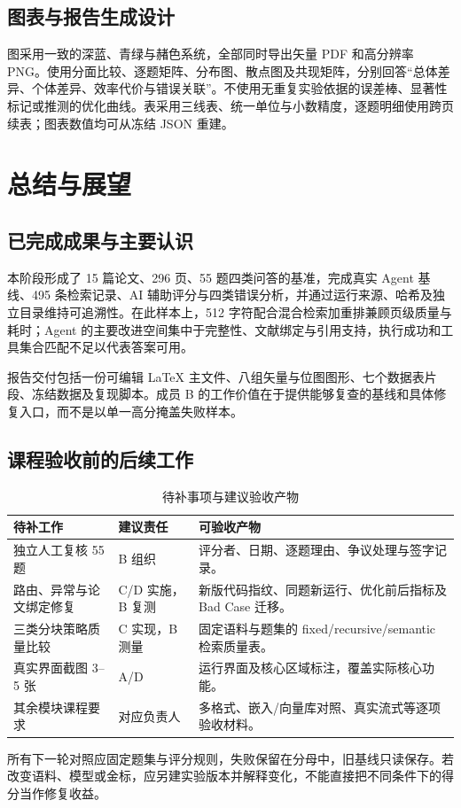 \documentclass[UTF8,a4paper,zihao=-4,fontset=none]{ctexart}
\begin{document}
\subsection{图表与报告生成设计}
图采用一致的深蓝、青绿与赭色系统，全部同时导出矢量 PDF 和高分辨率 PNG。使用分面比较、逐题矩阵、分布图、散点图及共现矩阵，分别回答“总体差异、个体差异、效率代价与错误关联”。不使用无重复实验依据的误差棒、显著性标记或推测的优化曲线。表采用三线表、统一单位与小数精度，逐题明细使用跨页续表；图表数值均可从冻结 JSON 重建。

\section{总结与展望}
\subsection{已完成成果与主要认识}
本阶段形成了 15 篇论文、296 页、55 题四类问答的基准，完成真实 Agent 基线、495 条检索记录、AI 辅助评分与四类错误分析，并通过运行来源、哈希及独立目录维持可追溯性。在此样本上，512 字符配合混合检索加重排兼顾页级质量与耗时；Agent 的主要改进空间集中于完整性、文献绑定与引用支持，执行成功和工具集合匹配不足以代表答案可用。

报告交付包括一份可编辑 LaTeX 主文件、八组矢量与位图图形、七个数据表片段、冻结数据及复现脚本。成员 B 的工作价值在于提供能够复查的基线和具体修复入口，而不是以单一高分掩盖失败样本。

\subsection{课程验收前的后续工作}
\begin{table}[H]\caption{待补事项与建议验收产物}\small\centering
\begin{tabularx}{\linewidth}{@{}L{40mm}L{22mm}Y@{}}\toprule 待补工作 & 建议责任 & 可验收产物\\\midrule
独立人工复核 55 题 & B 组织 & 评分者、日期、逐题理由、争议处理与签字记录。\\
路由、异常与论文绑定修复 & C/D 实施，B 复测 & 新版代码指纹、同题新运行、优化前后指标及 Bad Case 迁移。\\
三类分块策略质量比较 & C 实现，B 测量 & 固定语料与题集的 fixed/recursive/semantic 检索质量表。\\
真实界面截图 3--5 张 & A/D & 运行界面及核心区域标注，覆盖实际核心功能。\\
其余模块课程要求 & 对应负责人 & 多格式、嵌入/向量库对照、真实流式等逐项验收材料。\\\bottomrule\end{tabularx}
\end{table}
所有下一轮对照应固定题集与评分规则，失败保留在分母中，旧基线只读保存。若改变语料、模型或金标，应另建实验版本并解释变化，不能直接把不同条件下的得分当作修复收益。
\FloatBarrier
\end{document}
